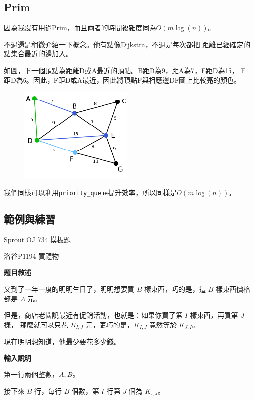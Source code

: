    \subsection{Prim}

    因為我沒有用過Prim，而且兩者的時間複雜度同為$O(m\log{(n)})$。

    不過還是稍微介紹一下概念。他有點像Dijkstra，不過是每次都把
    距離已經確定的點集合最近的邊加入。

    如圖，下一個頂點為距離D或A最近的頂點。B距D為9，距A為7，E距D為15，
    F距D為6。因此，F距D或A最近，因此將頂點F與相應邊DF圖上比較亮的顏色。

    \begin{figure}[ht]
        \centering
        \includegraphics[width=0.5\textwidth]{../Images/Graph4.png}
    \end{figure}

    我們同樣可以利用\verb|priority_queue|提升效率，所以同樣是$O(m\log{(n)})$。

    \subsection{範例與練習}

    \problem Sprout OJ 734 模板題

    \problem 洛谷P1194 買禮物

    \textbf{題目敘述}

    又到了一年一度的明明生日了，明明想要買 $B$ 樣東西，巧的是，這 $B$ 樣東西價格都是 $A$ 元。

    但是，商店老闆說最近有促銷活動，也就是：如果你買了第 $I$ 樣東西，再買第 $J$ 樣，
    那麼就可以只花 $K_{I,J}$ 元，更巧的是，$K_{I,J}$ 竟然等於 $K_{J,I}$。

    現在明明想知道，他最少要花多少錢。

    \textbf{輸入說明}

    第一行兩個整數，$A,B$。

    接下來 $B$ 行，每行 $B$ 個數，第 $I$ 行第 $J$ 個為 $K_{I,J}$。

